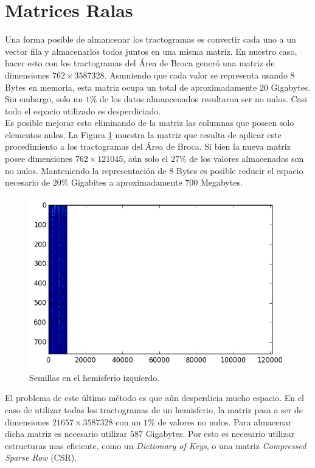 \section{Matrices Ralas}

Una forma posible de almancenar los tractogramas es convertir cada uno a un 
vector fila y almacenarlos todos juntos en una misma matriz. En nuestro caso,
hacer esto con los tractogramas del \'Area de Broca gener\'o una matriz de
dimensiones $762\times3587328$. Asumiendo que cada valor se representa usando 
$8$ Bytes en memoria, esta matriz ocupa un total de aproximadamente $20$ Gigabytes.
Sin embargo, solo un $1\%$ de los datos almancenados resultaron ser no nulos. 
Casi todo el espacio utilizado es desperdiciado.\\

Es posible mejorar esto eliminando de la matriz las columnas que poseen solo
elementos nulos. La Figura \ref{fig:densa} muestra la matriz que resulta de aplicar
este procedimiento a los tractogramas del \'Area de Broca. Si bien la nueva
matriz posee dimensiones $762\times121045$, a\'un solo el $27\%$ de los valores 
almacenados son no nulos. Manteniendo la representaci\'on de $8$ Bytes es posible
reducir el espacio necesario de $20\%$ Gigabites a aproximadamente $700$ Megabytes.\\

\begin{figure}[h!]
   \centering
    \includegraphics[width=\textwidth]{img/densa_broca.png}
    \caption{Semillas en el hemisferio izquierdo. }
    \label{fig:densa}
\end{figure}

El problema de este \'ultimo m\'etodo es que a\'un desperdicia mucho espacio. En
el caso de utilizar todas los tractogramas de un hemisferio, la matriz pasa a ser
de dimensiones $21657\times3587328$ con un $1\%$ de valores no nulos. Para almacenar
dicha matriz es necesario utilizar $587$ Gigabytes. Por esto es necesario
utilizar estructuras mas eficiente, como un \textit{Dictionary of Keys}, o
una matriz \textit{Compressed Sparse Row} (CSR). \\

